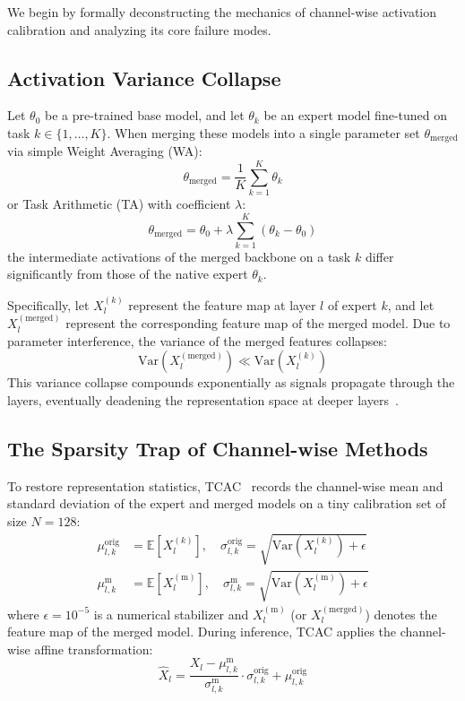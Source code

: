 \documentclass{article}
\theoremstyle{plain}
\theoremstyle{definition}
\theoremstyle{remark}
\begin{document}
We begin by formally deconstructing the mechanics of channel-wise activation calibration and analyzing its core failure modes.

\subsection{Activation Variance Collapse}
Let $\theta_0$ be a pre-trained base model, and let $\theta_k$ be an expert model fine-tuned on task $k \in \{1, \dots, K\}$. When merging these models into a single parameter set $\theta_{\text{merged}}$ via simple Weight Averaging (WA):
\begin{equation}
    \theta_{\text{merged}} = \frac{1}{K} \sum_{k=1}^K \theta_k
\end{equation}
or Task Arithmetic (TA) with coefficient $\lambda$:
\begin{equation}
    \theta_{\text{merged}} = \theta_0 + \lambda \sum_{k=1}^K (\theta_k - \theta_0)
\end{equation}
the intermediate activations of the merged backbone on a task $k$ differ significantly from those of the native expert $\theta_k$. 

Specifically, let $X_l^{(k)}$ represent the feature map at layer $l$ of expert $k$, and let $X_l^{(\text{merged})}$ represent the corresponding feature map of the merged model. Due to parameter interference, the variance of the merged features collapses:
\begin{equation}
    \text{Var}(X_l^{(\text{merged})}) \ll \text{Var}(X_l^{(k)})
\end{equation}
This variance collapse compounds exponentially as signals propagate through the layers, eventually deadening the representation space at deeper layers~\cite{jordan2022repair, submission5}.

\subsection{The Sparsity Trap of Channel-wise Methods}
To restore representation statistics, TCAC~\cite{submission5} records the channel-wise mean and standard deviation of the expert and merged models on a tiny calibration set of size $N=128$:
\begin{align}
    \mu_{l,k}^{\text{orig}} &= \mathbb{E}[X_{l}^{(k)}], \quad \sigma_{l,k}^{\text{orig}} = \sqrt{\text{Var}(X_{l}^{(k)}) + \epsilon} \\
    \mu_{l,k}^{\text{m}} &= \mathbb{E}[X_{l}^{(\text{m})}], \quad \sigma_{l,k}^{\text{m}} = \sqrt{\text{Var}(X_{l}^{(\text{m})}) + \epsilon}
\end{align}
where $\epsilon = 10^{-5}$ is a numerical stabilizer and $X_l^{(\text{m})}$ (or $X_l^{(\text{merged})}$) denotes the feature map of the merged model. During inference, TCAC applies the channel-wise affine transformation:
\begin{equation}
    \hat{X}_l = \frac{X_l - \mu_{l,k}^{\text{m}}}{\sigma_{l,k}^{\text{m}}} \cdot \sigma_{l,k}^{\text{orig}} + \mu_{l,k}^{\text{orig}}
\end{equation}
\end{document}
